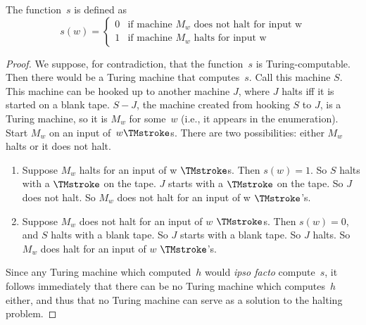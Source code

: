 \documentclass[../../../include/open-logic-section]{subfiles}
\begin{document}
\begin{defn} The function~$s$ is defined as
\[
s(w) =
\begin{cases}
  \text{0} & \text{if machine~$M_w$ does not halt for input w} \\
  \text{1} & \text{if machine~$M_w$ halts for input w}
\end{cases}
\]
\end{defn}

\begin{proof}
We suppose, for contradiction, that the function~$s$ is Turing-computable.
Then there would be a Turing machine that computes~$s$. Call this machine
 $S$. This
machine can be hooked up to another machine $J$, where $J$ halts iff it is
started on a blank tape. $S-J$, the machine created from hooking $S$ to
$J$, is a
Turing machine, so it is $M_w$ for some~$w$ (i.e., it appears in the
enumeration). Start $M_w$ on an input of~$w \TMstroke$s. There are two
possibilities: either $M_w$ halts or it does not halt.
\begin{enumerate}
\item Suppose $M_w$ halts for an input of w $\TMstroke$s. Then
  $s(w) = 1$. So $S$ halts with a $\TMstroke$ on the tape.  $J$ starts
  with a $\TMstroke$ on the tape. So $J$ does not halt. So $M_w$
  does not halt for an input of w $\TMstroke$'s.

\item Suppose $M_w$ does not halt for an input of $w$
  $\TMstroke$s.  Then $s(w) = 0$, and $S$ halts with a blank tape. So
  $J$ starts with a blank tape.  So $J$ halts. So $M_w$ does
  halt for an input of $w$ $\TMstroke$'s.
\end{enumerate}

Since any Turing machine which computed~$h$ would \emph{ipso facto}
compute~$s$, it follows immediately that there can be no Turing machine
which computes~$h$ either, and thus that no Turing machine can serve as a
solution to the halting problem.
\end{proof}
\end{document}
